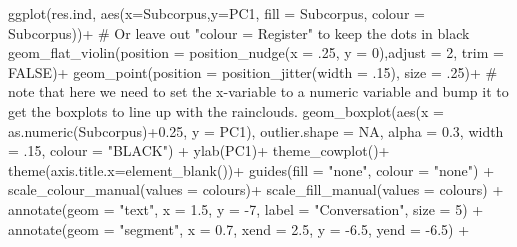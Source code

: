 \documentclass[
  letterpaper,
  DIV=11,
  numbers=noendperiod]{scrreprt}
\newenvironment{Shaded}{\begin{snugshade}}{\end{snugshade}}
\newcommand{\AttributeTok}[1]{\textcolor[rgb]{0.40,0.45,0.13}{#1}}
\newcommand{\CommentTok}[1]{\textcolor[rgb]{0.37,0.37,0.37}{#1}}
\newcommand{\ConstantTok}[1]{\textcolor[rgb]{0.56,0.35,0.01}{#1}}
\newcommand{\DecValTok}[1]{\textcolor[rgb]{0.68,0.00,0.00}{#1}}
\newcommand{\FloatTok}[1]{\textcolor[rgb]{0.68,0.00,0.00}{#1}}
\newcommand{\FunctionTok}[1]{\textcolor[rgb]{0.28,0.35,0.67}{#1}}
\newcommand{\NormalTok}[1]{\textcolor[rgb]{0.00,0.23,0.31}{#1}}
\newcommand{\SpecialCharTok}[1]{\textcolor[rgb]{0.37,0.37,0.37}{#1}}
\newcommand{\StringTok}[1]{\textcolor[rgb]{0.13,0.47,0.30}{#1}}
\begin{document}
\begin{Shaded}
\begin{Highlighting}[]
\FunctionTok{ggplot}\NormalTok{(res.ind, }\FunctionTok{aes}\NormalTok{(}\AttributeTok{x=}\NormalTok{Subcorpus,}\AttributeTok{y=}\NormalTok{PC1, }\AttributeTok{fill =}\NormalTok{ Subcorpus, }\AttributeTok{colour =}\NormalTok{ Subcorpus))}\SpecialCharTok{+} \CommentTok{\# Or leave out "colour = Register" to keep the dots in black}
  \FunctionTok{geom\_flat\_violin}\NormalTok{(}\AttributeTok{position =} \FunctionTok{position\_nudge}\NormalTok{(}\AttributeTok{x =}\NormalTok{ .}\DecValTok{25}\NormalTok{, }\AttributeTok{y =} \DecValTok{0}\NormalTok{),}\AttributeTok{adjust =} \DecValTok{2}\NormalTok{, }\AttributeTok{trim =} \ConstantTok{FALSE}\NormalTok{)}\SpecialCharTok{+}
  \FunctionTok{geom\_point}\NormalTok{(}\AttributeTok{position =} \FunctionTok{position\_jitter}\NormalTok{(}\AttributeTok{width =}\NormalTok{ .}\DecValTok{15}\NormalTok{), }\AttributeTok{size =}\NormalTok{ .}\DecValTok{25}\NormalTok{)}\SpecialCharTok{+}
\CommentTok{\# note that here we need to set the x{-}variable to a numeric variable and bump it to get the boxplots to line up with the rainclouds. }
  \FunctionTok{geom\_boxplot}\NormalTok{(}\FunctionTok{aes}\NormalTok{(}\AttributeTok{x =} \FunctionTok{as.numeric}\NormalTok{(Subcorpus)}\SpecialCharTok{+}\FloatTok{0.25}\NormalTok{, }\AttributeTok{y =}\NormalTok{ PC1), }\AttributeTok{outlier.shape =} \ConstantTok{NA}\NormalTok{, }\AttributeTok{alpha =} \FloatTok{0.3}\NormalTok{, }\AttributeTok{width =}\NormalTok{ .}\DecValTok{15}\NormalTok{, }\AttributeTok{colour =} \StringTok{"BLACK"}\NormalTok{) }\SpecialCharTok{+}
  \FunctionTok{ylab}\NormalTok{(}\StringTok{\textquotesingle{}PC1\textquotesingle{}}\NormalTok{)}\SpecialCharTok{+} 
  \FunctionTok{theme\_cowplot}\NormalTok{()}\SpecialCharTok{+}
  \FunctionTok{theme}\NormalTok{(}\AttributeTok{axis.title.x=}\FunctionTok{element\_blank}\NormalTok{())}\SpecialCharTok{+}
  \FunctionTok{guides}\NormalTok{(}\AttributeTok{fill =} \StringTok{"none"}\NormalTok{, }\AttributeTok{colour =} \StringTok{"none"}\NormalTok{) }\SpecialCharTok{+}
  \FunctionTok{scale\_colour\_manual}\NormalTok{(}\AttributeTok{values =}\NormalTok{ colours)}\SpecialCharTok{+}
  \FunctionTok{scale\_fill\_manual}\NormalTok{(}\AttributeTok{values =}\NormalTok{ colours) }\SpecialCharTok{+}
  \FunctionTok{annotate}\NormalTok{(}\AttributeTok{geom =} \StringTok{"text"}\NormalTok{, }\AttributeTok{x =} \FloatTok{1.5}\NormalTok{, }\AttributeTok{y =} \SpecialCharTok{{-}}\DecValTok{7}\NormalTok{, }\AttributeTok{label =} \StringTok{"Conversation"}\NormalTok{, }\AttributeTok{size =} \DecValTok{5}\NormalTok{) }\SpecialCharTok{+}
  \FunctionTok{annotate}\NormalTok{(}\AttributeTok{geom =} \StringTok{"segment"}\NormalTok{, }\AttributeTok{x =} \FloatTok{0.7}\NormalTok{, }\AttributeTok{xend =} \FloatTok{2.5}\NormalTok{, }\AttributeTok{y =} \SpecialCharTok{{-}}\FloatTok{6.5}\NormalTok{, }\AttributeTok{yend =} \SpecialCharTok{{-}}\FloatTok{6.5}\NormalTok{) }\SpecialCharTok{+}

\end{Highlighting}
\end{Shaded}
\end{document}
